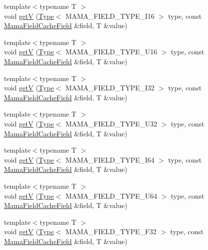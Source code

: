 \begin{DoxyCompactItemize}
\item 
{\footnotesize template$<$typename T $>$ }\\void \hyperlink{namespaceWombat_a974369cb77029edd2761777dbcad4ed8}{getV} (\hyperlink{classWombat_1_1Type}{Type}$<$ MAMA\_\-FIELD\_\-TYPE\_\-I16 $>$ type, const \hyperlink{classWombat_1_1MamaFieldCacheField}{MamaFieldCacheField} \&field, T \&value)
\item 
{\footnotesize template$<$typename T $>$ }\\void \hyperlink{namespaceWombat_a67c61b27dc82f7c20475967490ea067f}{getV} (\hyperlink{classWombat_1_1Type}{Type}$<$ MAMA\_\-FIELD\_\-TYPE\_\-U16 $>$ type, const \hyperlink{classWombat_1_1MamaFieldCacheField}{MamaFieldCacheField} \&field, T \&value)
\item 
{\footnotesize template$<$typename T $>$ }\\void \hyperlink{namespaceWombat_a9cde178e4fe347903e3a276779d8d48d}{getV} (\hyperlink{classWombat_1_1Type}{Type}$<$ MAMA\_\-FIELD\_\-TYPE\_\-I32 $>$ type, const \hyperlink{classWombat_1_1MamaFieldCacheField}{MamaFieldCacheField} \&field, T \&value)
\item 
{\footnotesize template$<$typename T $>$ }\\void \hyperlink{namespaceWombat_a5b31e8bb14f1f8dc2a169e99b58af05e}{getV} (\hyperlink{classWombat_1_1Type}{Type}$<$ MAMA\_\-FIELD\_\-TYPE\_\-U32 $>$ type, const \hyperlink{classWombat_1_1MamaFieldCacheField}{MamaFieldCacheField} \&field, T \&value)
\item 
{\footnotesize template$<$typename T $>$ }\\void \hyperlink{namespaceWombat_a33dce488b61562a36325d46730a0adb6}{getV} (\hyperlink{classWombat_1_1Type}{Type}$<$ MAMA\_\-FIELD\_\-TYPE\_\-I64 $>$ type, const \hyperlink{classWombat_1_1MamaFieldCacheField}{MamaFieldCacheField} \&field, T \&value)
\item 
{\footnotesize template$<$typename T $>$ }\\void \hyperlink{namespaceWombat_a8fe96dd711e344d221f74c7e1f8977e3}{getV} (\hyperlink{classWombat_1_1Type}{Type}$<$ MAMA\_\-FIELD\_\-TYPE\_\-U64 $>$ type, const \hyperlink{classWombat_1_1MamaFieldCacheField}{MamaFieldCacheField} \&field, T \&value)
\item 
{\footnotesize template$<$typename T $>$ }\\void \hyperlink{namespaceWombat_a9f981a37ecaaa2b2274f39b9bf8365ce}{getV} (\hyperlink{classWombat_1_1Type}{Type}$<$ MAMA\_\-FIELD\_\-TYPE\_\-F32 $>$ type, const \hyperlink{classWombat_1_1MamaFieldCacheField}{MamaFieldCacheField} \&field, T \&value)

\end{DoxyCompactItemize}
